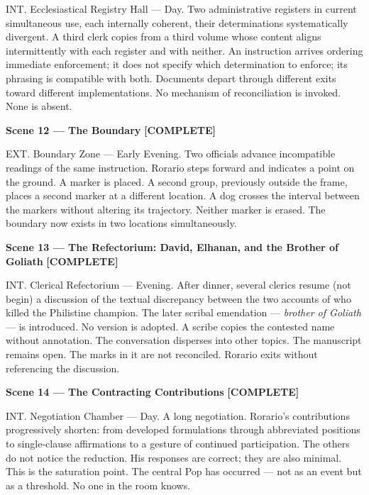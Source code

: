 \documentclass[12pt, oneside]{amsart}
\newcommand{\statuscomplete}{{\small\bfseries\color{complete}[COMPLETE]}}
\begin{document}
\noindent INT. Ecclesiastical Registry Hall --- Day. Two administrative registers in current simultaneous use, each internally coherent, their determinations systematically divergent. A third clerk copies from a third volume whose content aligns intermittently with each register and with neither. An instruction arrives ordering immediate enforcement; it does not specify which determination to enforce; its phrasing is compatible with both. Documents depart through different exits toward different implementations. No mechanism of reconciliation is invoked. None is absent.

\bigskip

\noindent\textbf{Scene 12 --- The Boundary} \statuscomplete

\noindent EXT. Boundary Zone --- Early Evening. Two officials advance incompatible readings of the same instruction. Rorario steps forward and indicates a point on the ground. A marker is placed. A second group, previously outside the frame, places a second marker at a different location. A dog crosses the interval between the markers without altering its trajectory. Neither marker is erased. The boundary now exists in two locations simultaneously.

\bigskip

\noindent\textbf{Scene 13 --- The Refectorium: David, Elhanan, and the Brother of Goliath} \statuscomplete

\noindent INT. Clerical Refectorium --- Evening. After dinner, several clerics resume (not begin) a discussion of the textual discrepancy between the two accounts of who killed the Philistine champion. The later scribal emendation --- \textit{brother of Goliath} --- is introduced. No version is adopted. A scribe copies the contested name without annotation. The conversation disperses into other topics. The manuscript remains open. The marks in it are not reconciled. Rorario exits without referencing the discussion.

\bigskip

\noindent\textbf{Scene 14 --- The Contracting Contributions} \statuscomplete

\noindent INT. Negotiation Chamber --- Day. A long negotiation. Rorario's contributions progressively shorten: from developed formulations through abbreviated positions to single-clause affirmations to a gesture of continued participation. The others do not notice the reduction. His responses are correct; they are also minimal. This is the saturation point. The central Pop has occurred --- not as an event but as a threshold. No one in the room knows.
\end{document}
